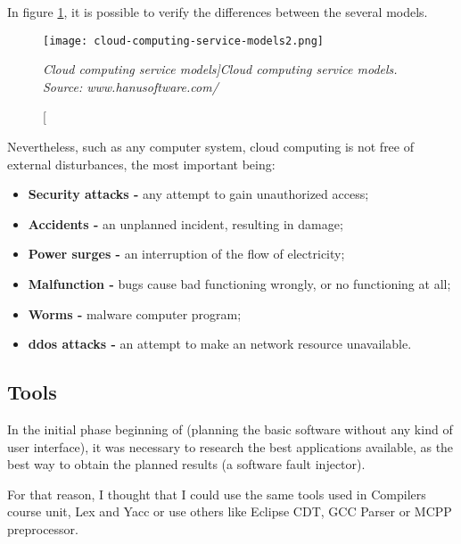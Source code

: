 In figure \ref{fig:cloudcomputingservicemodels}, it is possible to verify the differences between the several models.

\begin{figure}[!ht]
\begin{center}
\texttt{[image: cloud-computing-service-models2.png]}
\caption[\small \sl Cloud computing service models]{\small \sl Cloud computing service models. \textit{Source: www.hanusoftware.com/}\label{fig:cloudcomputingservicemodels}}
\end{center}
\end{figure}

Nevertheless, such as any computer system, cloud computing is not free of external disturbances\cite{wolter2012resilience}, the most important being:
\begin{itemize}
 	\item \textbf{Security attacks -} any attempt to gain unauthorized access;
 	\item \textbf{Accidents -} an unplanned incident, resulting in damage;
 	\item \textbf{Power surges -} an interruption of the flow of electricity;
 	\item \textbf{Malfunction -} bugs cause bad functioning wrongly, or no functioning at all;
 	\item \textbf{Worms -} malware computer program;
 	\item \textbf{\acl{ddos} attacks -} an attempt to make an network resource unavailable.
 \end{itemize}

\clearpage
\subsection{Tools}

In the initial phase beginning of (planning the basic software without any kind of user interface), it was necessary to research the best applications available, as the best way to obtain the planned results (a software fault injector).

For that reason, I thought that I could use the same tools used in Compilers course unit, Lex and Yacc or use others like Eclipse CDT, GCC Parser or MCPP preprocessor.\\


